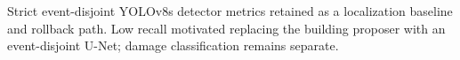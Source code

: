\begin{table}[t]
\centering
\caption{Strict event-disjoint YOLOv8s detector metrics retained as a
localization baseline and rollback path. Low recall motivated replacing the
building proposer with an event-disjoint U-Net; damage classification remains
separate.}
\label{tab:yolo-metrics}
\resizebox{\columnwidth}{!}{
}
\end{table}
